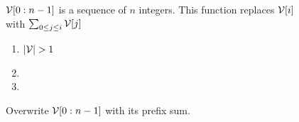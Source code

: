 \begin{figure*}[h!]
\begin{minipage}{\textwidth}
\begin{center}
{\begin{minipage}{\textwidth}
{                        \noindent
                        {\color{gray} ${\mathcal{V}}[0:n-1]$ is a sequence of $n$ integers.  This function replaces $\mathcal{V}[i]$ with $\sum_{0\leq j \leq i}{\mathcal{V}[j]}$}
                        \noindent
                        \begin{enumerate}
                            \item \xif $\left|\mathcal{V}\right| > 1$ \xthen
                            \item \T {}
                            \item \T {}
                        \end{enumerate}
                    }
                \end{minipage}
            }
            \vspace{-0.3cm}
            \caption{Overwrite $\mathcal{V}[0:n-1]$ with its prefix sum.}
            \label{fi:score-one-fold}
            \vspace{-0.3cm}
        \end{center}
    \end{minipage}
\end{figure*}

